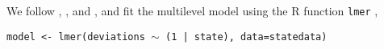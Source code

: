 \documentclass[thesis.tex]{subfiles}
\begin{document}
We follow \cite{Lock:2010aa}, \cite{Gelman:2006aa}, and \cite{Gelman:2007aa}, and fit the multilevel model using the R function \texttt{lmer} \citep{lme4},
\begin{center}
	\texttt{model <- lmer(deviations \(\sim\) (1 | state), data=statedata)}
\end{center}


\begin{comment}

For states, though, we can also note that deviations from the national average are relatively consistent between election cycles \cite{Lock:2010aa}. Here's a graph maybe. This means that a state that leans more Democratic than the nation during one election, will probably lean the same way during the next election. The model looks sort of like: \[
	a model,
\] where the things mean this. This gives us the mean for each state, this is how you put it into \texttt{lmer}.

We handle this using multilevel modeling, as in \cite{Lock:2010aa}. \textbf{What is multi-level regression?} Also called mixed-effects (it's like balancing between no effects and fixed effects). Takes advantage of both within-group and between-group information. If a group has very little data (like, state deviations from national vote over the last seven elections), it's ``shrunk'' towards the overall mean (shrinkage estimation). Also used in education, demographics, and geographical data \citep{Ghitza:2013aa,Gelman:2006aa,Aitkin:1981aa}.

The general ideas behind multilevel modeling were described in \cite{Harville:1977aa}, we see some equivalent approaches in \cite{Goldstein:1986aa} and \cite{Goldstein:1989aa}, and the modern approach using REML and Expectation-Maximization is described through example in \cite{Aitkin:1981aa}. \cite{Gelman:2006aa} gives a recent example of using and interpreting the results of multilevel modeling, using the \texttt{lme4} \citep{lme4} package in R \citep{R}. For more information, see \cite{Gelman:2007aa}.

Some people also solve it using the Bayesian approach \citep{Gelman:2003aa,Price:1996aa}, but we won't use that.

\end{comment}
\end{document}
